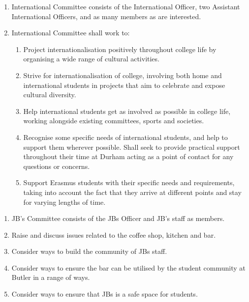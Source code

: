 \begin{enumerate}
    \item International Committee consists of the International Officer, two Assistant International Officers, and as many members as are interested.
    \item International Committee shall work to:
    \begin{enumerate}
        \item Project internationalisation positively throughout college life by organising a wide range of cultural activities.
        \item Strive for internationalisation of college, involving both home and international students in projects that aim to celebrate and expose cultural diversity.
        \item Help international students get as involved as possible in college life, working alongside existing committees, sports and societies.
        \item Recognise some specific needs of international students, and help to support them wherever possible. Shall seek to provide practical support throughout their time at Durham acting as a point of contact for any questions or concerns.
        \item Support Erasmus students with their specific needs and requirements, taking into account the fact that they arrive at different points and stay for varying lengths of time.
    \end{enumerate}
\end{enumerate}


\begin{enumerate}
    \item  JB’s Committee consists of the JBs Officer and JB’s staff as members.
    \item Raise and discuss issues related to the coffee shop, kitchen and bar. 
    \item Consider ways to build the community of JBs staff. 
    \item Consider ways to ensure the bar can be utilised by the student community at Butler in a range of ways.
    \item Consider ways to ensure that JBs is a safe space for students.
\end{enumerate}


